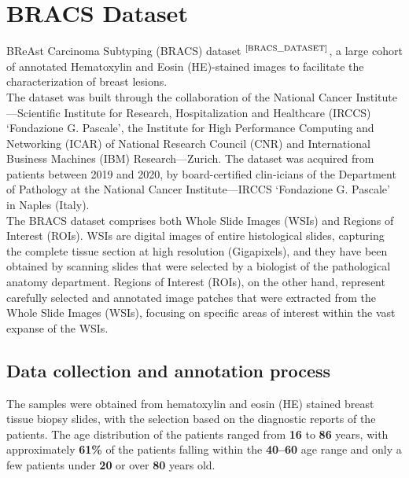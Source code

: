 \documentclass[
11pt, %
english, %
singlespacing, %
headsepline, %
]{project_structure}
\begin{document}
\newpage
\section{\acrshort{BRACS} Dataset}
BReAst Carcinoma Subtyping (\acrshort{BRACS}) dataset $^{\text{\cite{BRACS_DATASET}}}$, a large cohort of annotated Hematoxylin and Eosin (\acrshort{HE})-stained images to facilitate the characterization of breast lesions.\\

\noindent The dataset was built through the collaboration of the National Cancer Institute—Scientific Institute for Research, Hospitalization and Healthcare (\acrshort{IRCCS}) ‘Fondazione G. Pascale’, the Institute for High Performance Computing and Networking (\acrshort{ICAR}) of National Research Council (\acrshort{CNR}) and International Business Machines (IBM) Research—Zurich. The dataset was acquired from patients between 2019 and 2020, by board-certified clin-icians of the Department of Pathology at the National Cancer Institute—\acrshort{IRCCS} ‘Fondazione G. Pascale’ in Naples (Italy).\\

\noindent The \acrshort{BRACS} dataset comprises both Whole Slide Images (\acrshort{WSI}s) and Regions of Interest (\acrshort{ROI}s). \acrshort{WSI}s are digital images of entire histological slides, capturing the complete tissue section at high resolution (Gigapixels), and they have been obtained by scanning slides that were selected by a biologist of the pathological anatomy department. Regions of Interest (\acrshort{ROI}s), on the other hand, represent carefully selected and annotated image patches that were extracted from the Whole Slide Images (\acrshort{WSI}s), focusing on specific areas of interest within the vast expanse of the \acrshort{WSI}s.\\

\subsection{Data collection and annotation process}
The samples were obtained from hematoxylin and eosin (\acrshort{HE}) stained breast tissue biopsy slides, with the selection based on the diagnostic reports of the patients. The age distribution of the patients ranged from \textbf{16} to \textbf{86} years, with approximately \textbf{61\%} of the patients falling within the \textbf{40–60} age range and only a few patients under \textbf{20} or over \textbf{80} years old.\\
\end{document}
